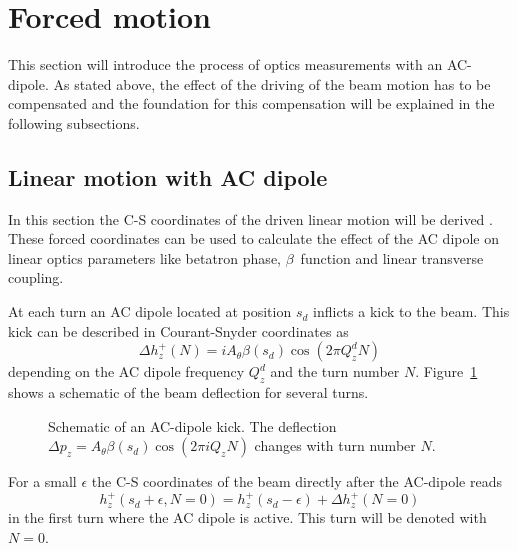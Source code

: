 \section{Forced motion}

This section will introduce the process of optics measurements with an AC-dipole. As stated above,
the effect of the driving of the beam motion has to be compensated and the foundation for this
compensation will be explained in the following subsections.

\subsection{Linear motion with AC dipole}
\newcommand{\Qd}[1]{Q^{d}_{#1}}
\label{sec_driven_coords}

In this section the C-S coordinates of the driven linear motion will be derived \cite{Miyamoto2010,Peggs1998}. These forced coordinates
can be used to calculate the effect of the AC dipole on linear optics parameters like betatron phase, 
$\beta$~function and linear transverse coupling.

At each turn an AC dipole located at position $s_d$ inflicts a kick to the beam. This kick can be
described in Courant-Snyder coordinates as
%
\begin{equation}
    \Delta h_z^+(N) = i A_\theta\beta(s_d) \cos(2\pi \Qd{z} N)
\end{equation}
%
depending on the AC dipole frequency $\Qd{z}$ and the turn number $N$. Figure~\ref{fig_ac_kick} shows
a schematic of the beam deflection for several turns.
%
\begin{figure}[ht]
    \centering
    
    \caption{
        Schematic of an AC-dipole kick. The deflection $\Delta p_z = A_\theta\beta(s_d)\cos(2\pi i Q_z N)$
        changes with turn number $N$.}
    \label{fig_ac_kick}
\end{figure}
%
For a small $\epsilon$ the C-S coordinates of the beam directly after the AC-dipole reads
%
\begin{equation}
    h_z^+(s_d + \epsilon, N=0) = h_z^+(s_d-\epsilon) + \Delta h_z^+(N=0)
    \label{eq_ackick}
\end{equation}
%
in the first turn where the AC dipole is active. This turn will be denoted with $N=0$.

